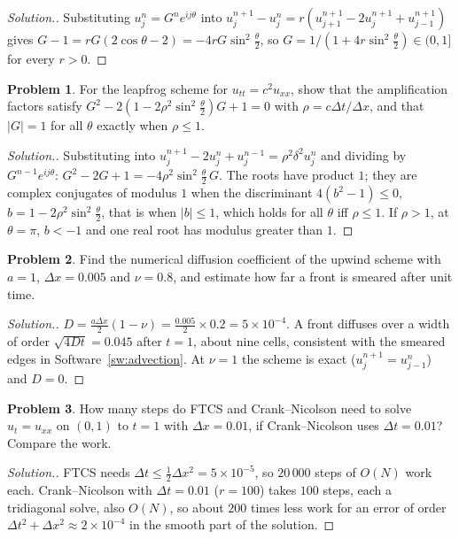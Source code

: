 \documentclass[11pt,a4paper]{article}
\numberwithin{equation}{section}
\theoremstyle{definition}
\newtheorem{problemx}{Problem}[subsection]
\newenvironment{problem}{\begin{problemx}}{\end{problemx}}
\newenvironment{solution}
  {\renewcommand{\qedsymbol}{}\begin{proof}[\textit{Solution}.]}
  {\end{proof}}
\begin{document}
\begin{solution}
Substituting $u_j^n = G^ne^{ij\theta}$ into $u_j^{n + 1} - u_j^n = r(u_{j + 1}^{n + 1} - 2u_j^{n + 1} + u_{j - 1}^{n + 1})$ gives $G - 1 = rG(2\cos\theta - 2) = -4rG\sin^2\frac\theta2$, so $G = 1/(1 + 4r\sin^2\frac\theta2) \in (0, 1]$ for every $r > 0$.
\end{solution}

\begin{problem}
For the leapfrog scheme for $u_{tt} = c^2u_{xx}$, show that the amplification factors satisfy $G^2 - 2(1 - 2\rho^2\sin^2\frac\theta2)G + 1 = 0$ with $\rho = c\Delta t/\Delta x$, and that $|G| = 1$ for all $\theta$ exactly when $\rho \leq 1$.
\end{problem}

\begin{solution}
Substituting into $u_j^{n + 1} - 2u_j^n + u_j^{n - 1} = \rho^2\delta^2u_j^n$ and dividing by $G^{n - 1}e^{ij\theta}$: $G^2 - 2G + 1 = -4\rho^2\sin^2\frac\theta2\,G$. The roots have product $1$; they are complex conjugates of modulus $1$ when the discriminant $4(b^2 - 1) \leq 0$, $b = 1 - 2\rho^2\sin^2\frac\theta2$,
that is when $|b| \leq 1$, which holds for all $\theta$ iff $\rho \leq 1$. If $\rho > 1$, at $\theta = \pi$, $b < -1$ and one real root has modulus greater than $1$.
\end{solution}

\begin{problem}
Find the numerical diffusion coefficient of the upwind scheme with $a = 1$, $\Delta x = 0.005$ and $\nu = 0.8$, and estimate how far a front is smeared after unit time.
\end{problem}

\begin{solution}
$D = \frac{a\Delta x}2(1 - \nu) = \frac{0.005}2\times 0.2 = 5 \times 10^{-4}$. A front diffuses over a width of order $\sqrt{4Dt} = 0.045$ after $t = 1$, about nine cells, consistent with the smeared edges in Software~\ref{sw:advection}. At $\nu = 1$ the scheme is exact ($u_j^{n + 1} = u_{j - 1}^n$) and $D = 0$.
\end{solution}

\begin{problem}
How many steps do FTCS and Crank--Nicolson need to solve $u_t = u_{xx}$ on $(0, 1)$ to $t = 1$ with $\Delta x = 0.01$, if Crank--Nicolson uses $\Delta t = 0.01$? Compare the work.
\end{problem}

\begin{solution}
FTCS needs $\Delta t \leq \frac12\Delta x^2 = 5 \times 10^{-5}$, so $20\,000$ steps of $O(N)$ work each. Crank--Nicolson with $\Delta t = 0.01$ ($r = 100$) takes $100$ steps, each a tridiagonal solve, also $O(N)$, so about $200$ times less work for an error of order $\Delta t^2 + \Delta x^2 \approx 2 \times 10^{-4}$ in the
smooth part of the solution.
\end{solution}
\end{document}
